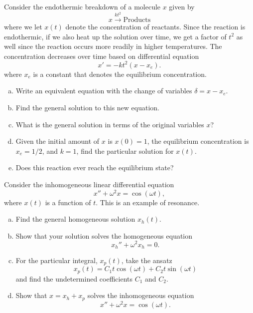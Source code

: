\documentclass[12pt]{amsbook}
\begin{document}
\begin{problem}
Consider the endothermic breakdown of a molecule $x$ given by
\[
x \xrightarrow{kt^2} \textrm{Products}
\]
where we let $x(t)$ denote the concentration of reactants. Since the reaction is endothermic, if we also heat up the solution over time, we get a factor of $t^2$ as well since the reaction occurs more readily in higher temperatures. The concentration decreases over time based on differential equation
\[
x'=-kt^2(x-x_e).
\]
where $x_e$ is a constant that denotes the equilibrium concentration. 
\begin{enumerate}[(a)]
    \item Write an equivalent equation with the change of variables $\delta=x-x_e$.
    \item Find the general solution to this new equation. 
    \item What is the general solution in terms of the original variables $x$?
    \item Given the initial amount of $x$ is $x(0)=1$, the equilibrium concentration is $x_e=1/2$, and $k=1$, find the particular solution for $x(t)$.
    \item Does this reaction ever reach the equilibrium state?
\end{enumerate}
\end{problem}

\newpage
\begin{problem}
Consider the inhomogeneous linear differential equation
\[
x''+\omega^2x=\cos(\omega t),
\]
where $x(t)$ is a function of $t$. This is an example of resonance.
\begin{enumerate}[(a)]
    \item Find the general homogeneous solution $x_h(t)$.
    \item Show that your solution solves the homogeneous equation
    \[
    x_h''+\omega^2x_h=0.
    \]
    \item For the particular integral, $x_p(t)$, take the ansatz
    \[
    x_p(t)=C_1t\cos(\omega t) + C_2 t\sin(\omega t)
    \]
    and find the undetermined coefficients $C_1$ and $C_2$.
    \item Show that $x=x_h+x_p$ solves the inhomogeneous equation
    \[
    x''+\omega^2 x = \cos(\omega t).
    \]
\end{enumerate}
\end{problem}
\end{document}

